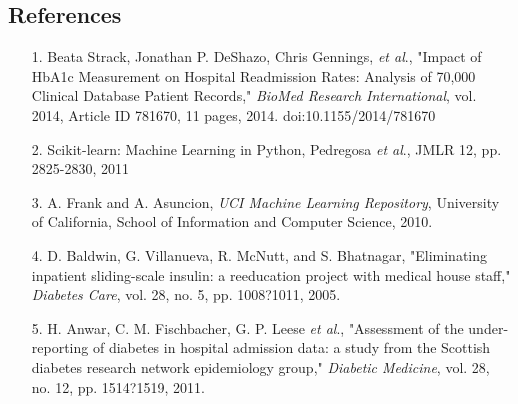 \documentclass[12pt]{article}
\newcounter{lastnote}
\begin{document}
\subsection*{References}
\begin{itemize}
\item[1.]
Beata Strack, Jonathan P. DeShazo, Chris Gennings, \textit{et al}., "Impact of HbA1c Measurement on Hospital Readmission Rates: Analysis of 70,000 Clinical Database Patient Records," \textit{BioMed Research International}, vol. 2014, Article ID 781670, 11 pages, 2014. doi:10.1155/2014/781670
\item[2.]
Scikit-learn: Machine Learning in Python, Pedregosa \textit{et al}., JMLR 12, pp. 2825-2830, 2011
\item[3.]
A. Frank and A. Asuncion, \textit{UCI Machine Learning Repository}, University of California, School of Information and Computer Science, 2010.
\item[4.]
D. Baldwin, G. Villanueva, R. McNutt, and S. Bhatnagar, "Eliminating inpatient sliding-scale insulin: a reeducation project with medical house staff," \textit{Diabetes Care}, vol. 28, no. 5, pp. 1008?1011, 2005.
\item[5.]
H. Anwar, C. M. Fischbacher, G. P. Leese \textit{et al}., "Assessment of the under-reporting of diabetes in hospital admission data: a study from the Scottish diabetes research network epidemiology group," \textit{Diabetic Medicine}, vol. 28, no. 12, pp. 1514?1519, 2011.
\end{itemize} 
















\clearpage
\end{document}

